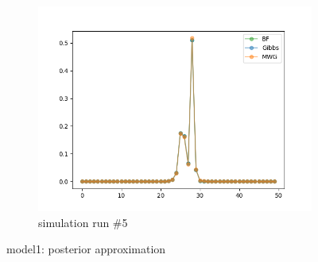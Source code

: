 \begin{figure}[H]
\begin{subfigure}{.3\textwidth}
    	\includegraphics[width=\linewidth]{../../plots/Posterior_post_burnin_M2_N50_NMCMC1_seed4_diffind2.png}
    	\caption{simulation run \#5}
	\end{subfigure}
	\caption{model1: posterior approximation}
\end{figure}

